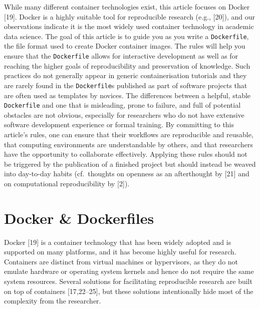 \documentclass[10pt,letterpaper]{article}
\begin{document}
While many different container technologies exist, this article focuses
on Docker {[}19{]}. Docker is a highly suitable tool for reproducible
research (e.g., {[}20{]}), and our observations indicate it is the most
widely used container technology in academic data science. The goal of
this article is to guide you as you write a \texttt{Dockerfile}, the
file format used to create Docker container images. The rules will help
you ensure that the \texttt{Dockerfile} allows for interactive
development as well as for reaching the higher goals of reproducibility
and preservation of knowledge. Such practices do not generally appear in
generic containerisation tutorials and they are rarely found in the
\texttt{Dockerfile}s published as part of software projects that are
often used as templates by novices. The differences between a helpful,
stable \texttt{Dockerfile} and one that is misleading, prone to failure,
and full of potential obstacles are not obvious, especially for
researchers who do not have extensive software development experience or
formal training. By committing to this article's rules, one can ensure
that their workflows are reproducible and reusable, that computing
environments are understandable by others, and that researchers have the
opportunity to collaborate effectively. Applying these rules should not
be triggered by the publication of a finished project but should instead
be weaved into day-to-day habits (cf.~thoughts on openness as an
afterthought by {[}21{]} and on computational reproducibility by
{[}2{]}).

\hypertarget{docker-dockerfiles}{%
\section{Docker \& Dockerfiles}\label{docker-dockerfiles}}

Docker {[}19{]} is a container technology that has been widely adopted
and is supported on many platforms, and it has become highly useful for
research. Containers are distinct from virtual machines or hypervisors,
as they do not emulate hardware or operating system kernels and hence do
not require the same system resources. Several solutions for
facilitating reproducible research are built on top of containers
{[}17,22--25{]}, but these solutions intentionally hide most of the
complexity from the researcher.
\end{document}
